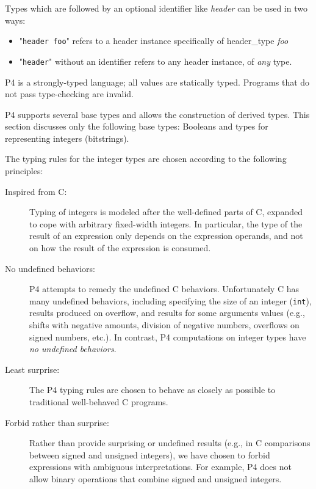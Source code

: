 \documentclass[12pt]{article}
\begin{document}
Types which are followed by an optional identifier like \textit{header} can be 
used in two ways:
\begin{itemize}
\item
    "\texttt{header foo}" refers to a header instance specifically of
    header_type \textit{foo}
\item
    "\texttt{header}" without an identifier refers to any header instance,
    of \textit{any} type.
\end{itemize}


\newtoggle{conditionalExpression}
\togglefalse{conditionalExpression}

\newcommand{\code}[1]{\texttt{#1}}
\newcommand{\bool}{\code{\textbf{bool}}}
\newcommand{\infint}{\code{\textbf{int}}}
\newcommand{\W}{\code{\emph{W}}}
\newcommand{\Wone}{\code{\emph{W1}}}
\newcommand{\bit}[1]{\code{\textbf{bit}<#1>}}
\newcommand{\Int}[1]{\code{\textbf{int}<#1>}}
\newlength{\descwidth}
\setlength{\descwidth}{12cm}

P4 is a strongly-typed language; all values are statically
typed. Programs that do not pass type-checking are invalid.

P4 supports several base types and allows the construction of derived
types.  This section discusses only the following base types: Booleans
and types for representing integers (bitstrings).


The typing rules for the integer types are chosen according to the
following principles:

\begin{description}
\item[Inspired from C:] Typing of integers is modeled after the
  well-defined parts of C, expanded to cope with arbitrary fixed-width
  integers.  In particular, the type of the result of an expression
  only depends on the expression operands, and not on how the result
  of the expression is consumed.
\item[No undefined behaviors:] P4 attempts to remedy the undefined C
  behaviors.  Unfortunately C has many undefined behaviors, including
  specifying the size of an integer (\code{int}), results produced on
  overflow, and results for some arguments values (e.g., shifts with
  negative amounts, division of negative numbers, overflows on signed
  numbers, etc.).  In contrast, P4 computations on integer types have
  \emph{no undefined behaviors}.
\item[Least surprise:] The P4 typing rules are chosen to behave as
  closely as possible to traditional well-behaved C programs.
\item[Forbid rather than surprise:] Rather than provide surprising or
  undefined results (e.g., in C comparisons between signed and
  unsigned integers), we have chosen to forbid expressions with
  ambiguous interpretations.  For example, P4 does not allow binary
  operations that combine signed and unsigned integers.
\end{description}
\end{document}
